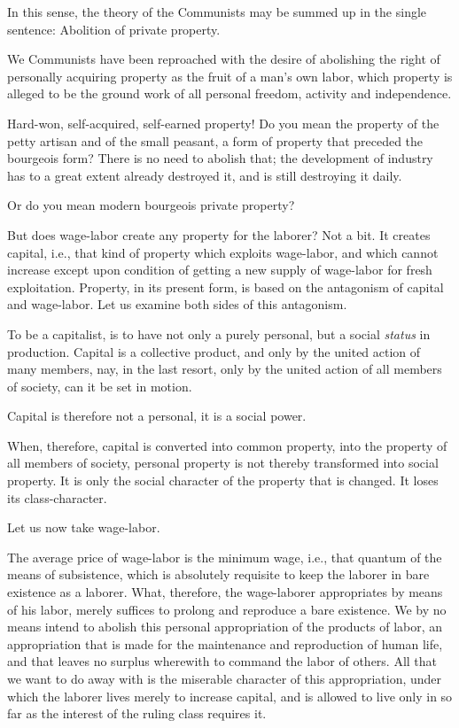 In this sense, the theory of the Communists may be summed up in the single sentence: Abolition of private property.

We Communists have been reproached with the desire of abolishing the right of personally acquiring property as the fruit of a man's own labor, which property is alleged to be the ground work of all personal freedom, activity and independence.

Hard-won, self-acquired, self-earned property! Do you mean the property of the petty artisan and of the small peasant, a form of property that preceded the bourgeois form? There is no need to abolish that; the development of industry has to a great extent already destroyed it, and is still destroying it daily.

Or do you mean modern bourgeois private property?

But does wage-labor create any property for the laborer? Not a bit. It creates capital, i.e., that kind of property which exploits wage-labor, and which cannot increase except upon condition of getting a new supply of wage-labor for fresh exploitation. Property, in its present form, is based on the antagonism of capital and wage-labor. Let us examine both sides of this antagonism.

To be a capitalist, is to have not only a purely personal, but a social \emph{status} in production. Capital is a collective product, and only by the united action of many members, nay, in the last resort, only by the united action of all members of society, can it be set in motion.

Capital is therefore not a personal, it is a social power.

When, therefore, capital is converted into common property, into the property of all members of society, personal property is not thereby transformed into social property. It is only the social character of the property that is changed. It loses its class-character.

Let us now take wage-labor.

The average price of wage-labor is the minimum wage, i.e., that quantum of the means of subsistence, which is absolutely requisite to keep the laborer in bare existence as a laborer. What, therefore, the wage-laborer appropriates by means of his labor, merely suffices to prolong and reproduce a bare existence. We by no means intend to abolish this personal appropriation of the products of labor, an appropriation that is made for the maintenance and reproduction of human life, and that leaves no surplus wherewith to command the labor of others. All that we want to do away with is the miserable character of this appropriation, under which the laborer lives merely to increase capital, and is allowed to live only in so far as the interest of the ruling class requires it.

